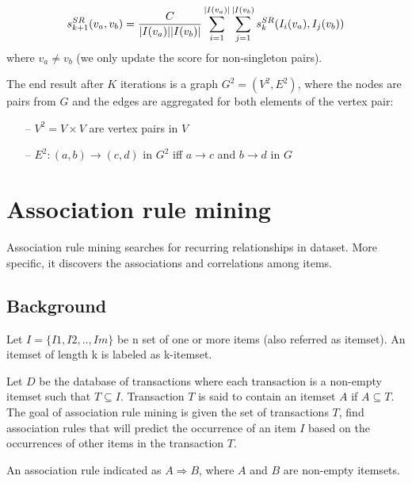 \begin{equation}
	s_{k+1}^{SR}(v_{a},v_{b})= \dfrac{C}{\arrowvert I(v_{a})\arrowvert \arrowvert I(v_{b})\arrowvert}
	\sum_{i=1}^{\arrowvert I(v_{a})\arrowvert}\sum_{j=1}^{\arrowvert I(v_{b})}s_{k}^{SR}(I_{i}(v_{a}), I_{j}(v_{b}))
\end{equation}
where $v_{a}\neq v_{b}$ (we only update the score for non-singleton pairs).

The end result after $K$ iterations is a graph $G^{2} = (V^{2},E^{2})$, where the nodes are pairs from $G$
and the edges are aggregated for both elements of the vertex pair:
\begin{itemize}
	\item[--] $V^{2} = V\times V$ are vertex pairs in $V$
	\item[--] $E^{2}:(a,b) \rightarrow (c,d)$ in $G^{2}$ iff $a\rightarrow c$ and $b\rightarrow d$ in $G$
\end{itemize}


\section{Association rule mining}
Association rule mining searches for recurring relationships in dataset.
More specific, it discovers the associations and correlations among items.
\subsection{Background}
Let $I=\{I1,I2,..,Im\}$ be n set of one or more items (also referred as itemset).
An itemset of length k is labeled as k-itemset.

Let $D$ be the database of transactions where each transaction is a non-empty itemset such that $T \subseteq I$.
Transaction $T$ is said to contain an itemset $A$  if $A\subseteq T$.
The goal of association rule mining is given the set of transactions $T$, 
find association rules that will predict the occurrence of an item $I$ based on the occurrences of other items in the transaction $T$.

An association rule indicated as $A\Rightarrow B$, where $A$ and $B$ are non-empty itemsets.
